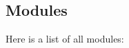 \subsection{Modules}
Here is a list of all modules\-:\begin{DoxyCompactList}
\item {}
\item {}
\end{DoxyCompactList}
